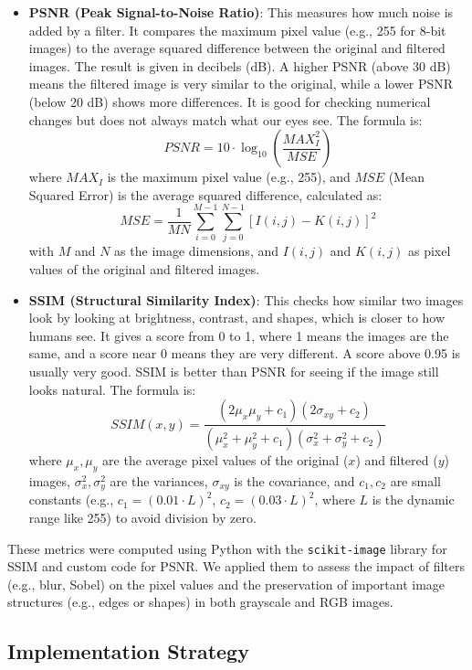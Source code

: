 \documentclass[12pt,a4paper]{article}
\begin{document}
	\begin{itemize}
		\item \textbf{PSNR (Peak Signal-to-Noise Ratio)}: This measures how much noise is added by a filter. It compares the maximum pixel value (e.g., 255 for 8-bit images) to the average squared difference between the original and filtered images. The result is given in decibels (dB). A higher PSNR (above 30 dB) means the filtered image is very similar to the original, while a lower PSNR (below 20 dB) shows more differences. It is good for checking numerical changes but does not always match what our eyes see. The formula is:
		\[
		PSNR = 10 \cdot \log_{10} \left( \frac{MAX_I^2}{MSE} \right)
		\]
		where \( MAX_I \) is the maximum pixel value (e.g., 255), and \( MSE \) (Mean Squared Error) is the average squared difference, calculated as:
		\[
		MSE = \frac{1}{MN} \sum_{i=0}^{M-1} \sum_{j=0}^{N-1} [I(i,j) - K(i,j)]^2
		\]
		with \( M \) and \( N \) as the image dimensions, and \( I(i,j) \) and \( K(i,j) \) as pixel values of the original and filtered images.
		
		\item \textbf{SSIM (Structural Similarity Index)}: This checks how similar two images look by looking at brightness, contrast, and shapes, which is closer to how humans see. It gives a score from 0 to 1, where 1 means the images are the same, and a score near 0 means they are very different. A score above 0.95 is usually very good. SSIM is better than PSNR for seeing if the image still looks natural. The formula is:
		\[
		SSIM(x, y) = \frac{(2 \mu_x \mu_y + c_1)(2 \sigma_{xy} + c_2)}{(\mu_x^2 + \mu_y^2 + c_1)(\sigma_x^2 + \sigma_y^2 + c_2)}
		\]
		where \( \mu_x, \mu_y \) are the average pixel values of the original (\( x \)) and filtered (\( y \)) images, \( \sigma_x^2, \sigma_y^2 \) are the variances, \( \sigma_{xy} \) is the covariance, and \( c_1, c_2 \) are small constants (e.g., \( c_1 = (0.01 \cdot L)^2 \), \( c_2 = (0.03 \cdot L)^2 \), where \( L \) is the dynamic range like 255) to avoid division by zero.
	\end{itemize}
	
	These metrics were computed using Python with the \texttt{scikit-image} library for SSIM and custom code for PSNR. We applied them to assess the impact of filters (e.g., blur, Sobel) on the pixel values and the preservation of important image structures (e.g., edges or shapes) in both grayscale and RGB images.
	\subsection{Implementation Strategy}
	
\end{document}
